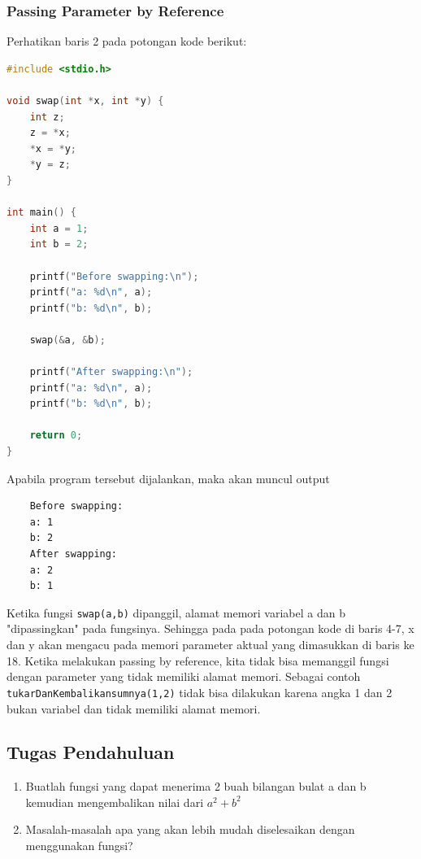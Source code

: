 \subsubsection{Passing Parameter by Reference}
Perhatikan baris 2 pada potongan kode berikut:
\begin{lstlisting}[language=c,caption = Passing by Reference,label=lst:passbyreference01]
#include <stdio.h>

void swap(int *x, int *y) {
    int z;
    z = *x;
    *x = *y;
    *y = z;
}

int main() {
    int a = 1;
    int b = 2;
    
    printf("Before swapping:\n");
    printf("a: %d\n", a);
    printf("b: %d\n", b);
    
    swap(&a, &b);
    
    printf("After swapping:\n");
    printf("a: %d\n", a);
    printf("b: %d\n", b);
    
    return 0;
}
\end{lstlisting}
Apabila program tersebut dijalankan, maka akan muncul output
\begin{verbatim}
    Before swapping:
    a: 1
    b: 2
    After swapping:
    a: 2
    b: 1
\end{verbatim}

Ketika fungsi \verb|swap(a,b)| dipanggil, alamat memori variabel a dan b "dipassingkan" pada fungsinya. Sehingga pada pada potongan kode di baris 4-7, x dan y akan mengacu pada memori parameter aktual yang dimasukkan di baris ke 18. Ketika melakukan passing by reference, kita tidak bisa memanggil fungsi dengan parameter yang tidak memiliki alamat memori. Sebagai contoh \verb|tukarDanKembalikansumnya(1,2)| tidak bisa dilakukan karena angka 1 dan 2 bukan variabel dan tidak memiliki alamat memori.

\subsection{Tugas Pendahuluan}
\begin{enumerate}
    \item Buatlah fungsi yang dapat menerima 2 buah bilangan bulat a dan b kemudian mengembalikan nilai dari $a^2 + b^2$
    \item Masalah-masalah apa yang akan lebih mudah diselesaikan dengan menggunakan fungsi?
\end{enumerate}

